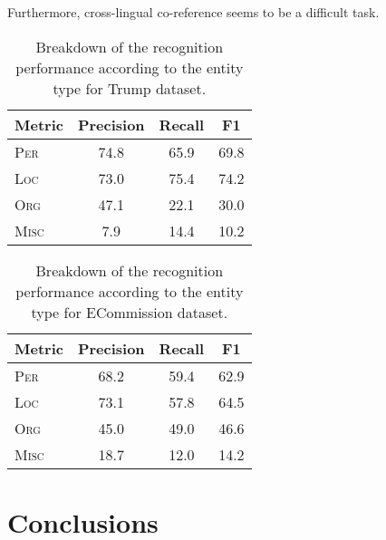 \documentclass[11pt]{article}
\begin{document}
Furthermore, cross-lingual co-reference seems to be a difficult task.


\begin{table}
  \begin{center}
    \begin{footnotesize}
      \begin{tabular}{lccc}
        \toprule 
        Metric & Precision & Recall & F1 \\
        \midrule
	\textsc{Per} & 74.8 & 65.9 & 69.8 \\
	\textsc{Loc} & 73.0 & 75.4 & 74.2 \\
	\textsc{Org} & 47.1 & 22.1 & 30.0 \\
	\textsc{Misc} & 7.9 & 14.4 & 10.2 \\
        \bottomrule
      \end{tabular}
    \end{footnotesize}
  \end{center}
  \caption{Breakdown of the recognition performance according to the entity type for {\sc Trump} dataset.}
  \label{tab:recognition-breakdown-trump}
\end{table}

\begin{table}
  \begin{center}
    \begin{footnotesize}
      \begin{tabular}{lccc}
        \toprule 
        Metric & Precision & Recall & F1 \\
        \midrule
	\textsc{Per} & 68.2 & 59.4 & 62.9 \\
	\textsc{Loc} & 73.1 & 57.8 & 64.5 \\
	\textsc{Org} & 45.0 & 49.0 & 46.6 \\
	\textsc{Misc} & 18.7 & 12.0 & 14.2 \\
        \bottomrule
      \end{tabular}
    \end{footnotesize}
  \end{center}
  \caption{Breakdown of the recognition performance according to the entity type for {\sc ECommission} dataset.}
  \label{tab:recognition-breakdown-ec}
\end{table}

\section{Conclusions}
\label{sec:conclusions}
\end{document}
